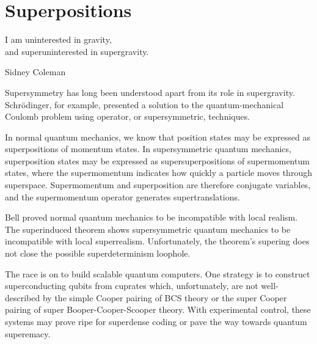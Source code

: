 \section{Superpositions}
\epigraph{I am uninterested in gravity,\\
and superuninterested in supergravity.}{Sidney Coleman\cite{vanNieuwenhuizen:2016}}

Supersymmetry has long been understood apart from its role in supergravity.
Schr\"{o}dinger, for example, presented a solution\cite{10.2307/20490744} to the quantum-mechanical Coulomb problem using operator, or supersymmetric, techniques\cite{RevModPhys.23.21}.

In normal quantum mechanics, we know that position states may be expressed as superpositions of momentum states.
In supersymmetric quantum mechanics, superposition states may be expressed as supersuperpositions of supermomentum states, where the supermomentum indicates how quickly a particle moves through superspace.
Supermomentum and superposition are therefore conjugate variables, and the supermomentum operator generates supertranslations.

Bell proved normal quantum mechanics to be incompatible with local realism\cite{bell1964einstein}.
The superinduced theorem shows supersymmetric quantum mechanics to be incompatible with local superrealism.
Unfortunately, the theorem's supering does not close the possible superdeterminism loophole.

The race is on to build scalable quantum computers.
One strategy is to construct superconducting qubits from cuprates which, unfortunately, are not well-described by the simple Cooper pairing of BCS theory\cite{Bardeen:1957kj} or the super Cooper pairing of super Booper-Cooper-Scooper theory.
With experimental control, these systems may prove ripe for superdense coding\cite{PhysRevLett.69.2881} or pave the way towards quantum superemacy\cite{Preskill:2012tg}.
